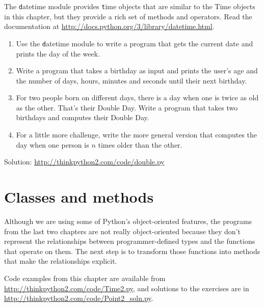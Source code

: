 \documentclass[
DIV=11,
fontsize=13,
twoside,
headinclude=false,
titlepage=firstiscover,
abstract=true,
headsepline=true,
footsepline=true,
chapterprefix=true, %
headings=big,
bibliography=totoc,%
captions=tableheading
]{scrbook}
\theoremstyle{definition}
\begin{document}
\begin{exercise}
\normalfont
{}

The {\texttt datetime} module provides {\texttt time} objects
that are similar to the Time objects in this chapter, but
they provide a rich set of methods and operators.  Read the
documentation at \url{http://docs.python.org/3/library/datetime.html}.

\begin{enumerate}

\item Use the {\texttt datetime} module to write a program that gets the
  current date and prints the day of the week.

\item Write a program that takes a birthday as input and prints the
  user's age and the number of days, hours, minutes and seconds until
  their next birthday.

\item For two people born on different days, there is a day when one
  is twice as old as the other.  That's their Double Day.  Write a
  program that takes two birthdays and computes their Double Day.

\item For a little more challenge, write the more general version that
  computes the day when one person is $n$ times older than the other.

\end{enumerate}

Solution: \url{http://thinkpython2.com/code/double.py}

\end{exercise}


\chapter{Classes and methods}

Although we are using some of Python's object-oriented features,
the programs from the last two chapters are not really
object-oriented because they don't represent the relationships
between programmer-defined types and the functions that operate
on them.  The next step is to transform those functions into
methods that make the relationships explicit.

Code examples from this chapter are available from
\url{http://thinkpython2.com/code/Time2.py}, and solutions
to the exercises are in \url{http://thinkpython2.com/code/Point2_soln.py}.
\end{document}

